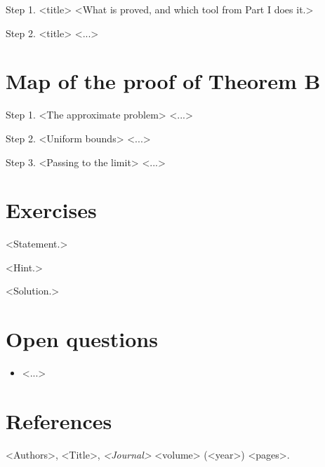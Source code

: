 \begin{step}{\routine{}Step 1. <title>}
<What is proved, and which tool from Part I does it.>
\end{step}

\begin{step}{\routine{}Step 2. <title>}
<...>
\end{step}

\section{Map of the proof of Theorem B}

\begin{stepnew}{\newidea{}Step 1. <The approximate problem>}
<...>
\end{stepnew}

\begin{step}{\routine{}Step 2. <Uniform bounds>}
<...>
\end{step}

\begin{step}{\routine{}Step 3. <Passing to the limit>}
<...>
\end{step}

\section{Exercises}

\begin{exercise}
  <Statement.>
  \begin{hint}
    <Hint.>
  \end{hint}
  \begin{solution}
    <Solution.>
  \end{solution}
\end{exercise}

\section{Open questions}

\begin{itemize}
\item <...>
\end{itemize}

\section*{References}

\begin{enumerate}[label={[\arabic*]}, leftmargin=*]
\item <Authors>, <Title>, \emph{<Journal>} <volume> (<year>) <pages>.
\end{enumerate}
